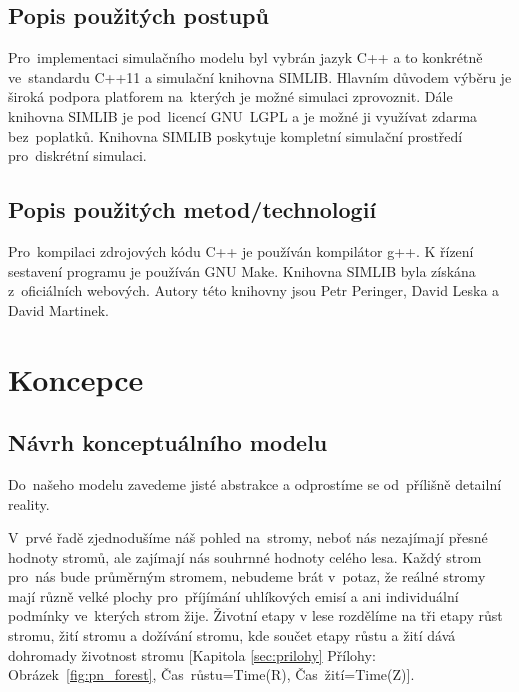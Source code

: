 \documentclass[a4paper, 11pt, titlepage]{article}
\begin{document}
\subsection{Popis použitých postupů}

Pro~implementaci simulačního modelu\cite[snímek 44]{IMS_prez} byl vybrán jazyk C++ a to konkrétně ve~standardu C++11 a simulační knihovna SIMLIB\cite{simlib}. Hlavním důvodem výběru je široká podpora platforem na~kterých je možné simulaci zprovoznit. Dále knihovna SIMLIB je pod~licencí GNU~LGPL a je možné ji využívat zdarma bez~poplatků. Knihovna SIMLIB poskytuje kompletní simulační prostředí\cite[snímek 38]{IMS_prez} pro~diskrétní\cite[snímek 32]{IMS_prez} simulaci.


\subsection{Popis použitých metod/technologií}

Pro~kompilaci zdrojových kódu C++ je používán kompilátor g++. K řízení sestavení programu je používán GNU Make. 
Knihovna SIMLIB byla získána z~oficiálních webových\cite{simlib}. Autory této knihovny jsou Petr Peringer, David Leska a David Martinek.

\newpage
\section{Koncepce} \label{sec:koncepce}

\subsection{Návrh konceptuálního modelu\cite[snímek 48]{IMS_prez}}

Do~našeho modelu\cite[snímek 7]{IMS_prez} zavedeme jisté abstrakce a odprostíme se od~přílišně detailní reality. 

V~prvé řadě zjednodušíme náš pohled na~stromy, neboť nás nezajímají přesné hodnoty stromů, ale zajímají nás souhrnné hodnoty celého lesa. Každý strom pro~nás bude průměrným stromem, nebudeme brát v~potaz, že reálné stromy mají různě velké plochy pro~příjímání uhlíkových emisí a ani individuální podmínky ve~kterých strom žije. Životní etapy v lese rozdělíme na tři etapy růst stromu, žití stromu a dožívání stromu, kde součet etapy růstu a žití dává dohromady životnost stromu [Kapitola \ref{sec:prilohy} Přílohy: Obrázek~\ref{fig:pn_forest}, \sloppy Čas~růstu=Time(R), \sloppy Čas~žití=Time(Z)].
\end{document}
